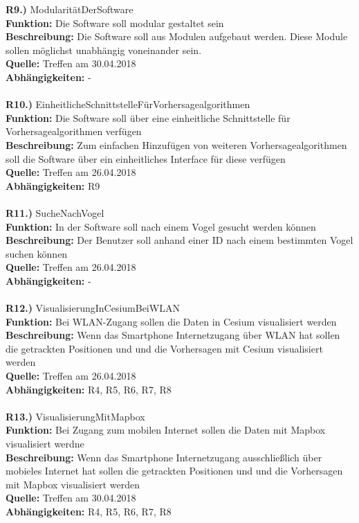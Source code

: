 \documentclass{article}
\begin{document}
	
	\textbf{R9.)} ModularitätDerSoftware\\
	\textbf{Funktion:} Die Software soll modular gestaltet sein\\
	\textbf{Beschreibung:} Die Software soll aus Modulen aufgebaut werden. Diese Module sollen möglichst unabhängig voneinander sein.\\
	\textbf{Quelle:} Treffen am 30.04.2018\\
	\textbf{Abhängigkeiten:} -\\\\
	
	\textbf{R10.)} EinheitlicheSchnittstelleFürVorhersagealgorithmen\\
	\textbf{Funktion:} Die Software soll über eine einheitliche Schnittstelle für Vorhersagealgorithmen verfügen\\
	\textbf{Beschreibung:} Zum einfachen Hinzufügen von weiteren Vorhersagealgorithmen soll die Software über ein einheitliches Interface für diese verfügen\\
	\textbf{Quelle:} Treffen am 26.04.2018\\
	\textbf{Abhängigkeiten:} R9\\\\
	
	\textbf{R11.)} SucheNachVogel\\
	\textbf{Funktion:} In der Software soll nach einem Vogel gesucht werden können\\
	\textbf{Beschreibung:} Der Benutzer soll anhand einer ID nach einem bestimmten Vogel suchen können\\
	\textbf{Quelle:} Treffen am 26.04.2018\\
	\textbf{Abhängigkeiten:} -\\\\
	
	\textbf{R12.)} VisualisierungInCesiumBeiWLAN\\
	\textbf{Funktion:} Bei WLAN-Zugang sollen die Daten in Cesium visualisiert werden\\
	\textbf{Beschreibung:} Wenn das Smartphone Internetzugang über WLAN hat sollen die getrackten Positionen und und die Vorhersagen mit Cesium visualisiert werden\\
	\textbf{Quelle:} Treffen am 26.04.2018\\
	\textbf{Abhängigkeiten:} R4, R5, R6, R7, R8\\\\
	
	\textbf{R13.)} VisualisierungMitMapbox\\
	\textbf{Funktion:} Bei Zugang zum mobilen Internet sollen die Daten mit Mapbox visualisiert werdne\\
	\textbf{Beschreibung:} Wenn das Smartphone Internetzugang ausschließlich über mobieles Internet hat sollen die getrackten Positionen und und die Vorhersagen mit Mapbox visualisiert werden\\
	\textbf{Quelle:} Treffen am 30.04.2018\\
	\textbf{Abhängigkeiten:} R4, R5, R6, R7, R8\\\\
	
\end{document}
